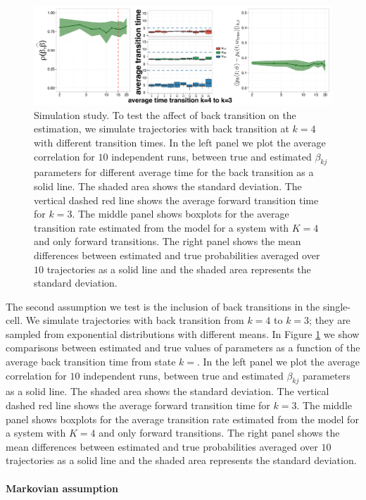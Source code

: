 \begin{figure}
  \centering \includegraphics[width=1\textwidth]{pics/back-trans.pdf}
  \caption{Simulation study. To test the affect of back transition on the estimation, we simulate trajectories with back transition at $k=4$ with different transition times. In the left panel we plot the average correlation for $10$ independent runs, between true and estimated $\beta_{kj}$ parameters for different average time for the back transition as a solid line. The shaded area shows the standard deviation. The vertical dashed red line shows the average forward transition time for $k=3$. The middle panel shows boxplots for the average transition rate estimated from the model for a system with $K=4$ and only forward transitions. The right panel shows the mean differences between estimated and true probabilities averaged over $10$ trajectories as a solid line and the shaded area represents the standard deviation.}
    \label{fig:back}
\end{figure}


The second assumption we test is the inclusion of back transitions in the single-cell. We simulate trajectories with back transition from $k=4$ to $k=3$; they are sampled from exponential distributions with different means. In Figure \ref{fig:back} we show comparisons between estimated and true values of parameters as a function of the average back transition time from state $k=$. In the left panel we plot the average correlation for $10$ independent runs, between true and estimated $\beta_{kj}$ parameters as a solid line. The shaded area shows the standard deviation. The vertical dashed red line shows the average forward transition time for $k=3$. The middle panel shows boxplots for the average transition rate estimated from the model for a system with $K=4$ and only forward transitions. The right panel shows the mean differences between estimated and true probabilities averaged over $10$ trajectories as a solid line and the shaded area represents the standard deviation.

\paragraph{Markovian assumption}
\label{sec:stud-t-distr}


